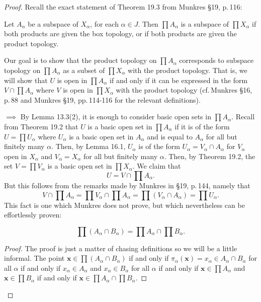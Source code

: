 \begin{proof}
Recall the exact statement of Theorem 19.3 from Munkres \S19,
p.\,116:
\begin{theorem*}
Let $A_\alpha$ be a subspace of $X_\alpha$, for each $\alpha\in
J$. Then $\prod A_\alpha$ is a subspace of $\prod X_\alpha$ if
both products are given the box topology, or if both products are
given the product topology.
\end{theorem*}
Our goal is to show that the  product topology on $\prod
A_\alpha$ corresponds to subspace topology on $\prod
A_\alpha$ as a subset of $\prod X_\alpha$ with the
product topology. That is, we will show that $U$ is open in
$\prod A_\alpha$ if and only if it can be expressed in the form
$V\cap\prod A_\alpha$ where $V$ is open in $\prod X_\alpha$ with
the product topology (cf.\,Munkres \S16, p.\,88 and Munkres \S19,
pp.\,114-116 for the relevant definitions).

$\implies$ By Lemma 13.3(2), it is enough to consider basic open
sets in $\prod A_\alpha$. Recall from Theorem 19.2 that $U$ is a
basic open set in $\prod A_\alpha$ if it is of the form $U=\prod
U_\alpha$ where $U_\alpha$ is a basic open set in $A_\alpha$ and
is equal to $A_\alpha$ for all but finitely many $\alpha$. Then,
by Lemma 16.1, $U_\alpha$ is of the form $U_\alpha=V_\alpha\cap
A_\alpha$ for $V_\alpha$ open in $X_\alpha$ and
$V_\alpha=X_\alpha$ for all but finitely many $\alpha$. Then, by
Theorem 19.2, the set $V=\prod V_\alpha$ is a basic open set in
$\prod X_\alpha$. We claim that
\[
U=V\cap\prod A_\alpha.
\]
But this follows from the remarks made by Munkres in \S19,
p.\,144, namely that
\[
V\cap\prod A_\alpha=\prod V_\alpha\cap\prod
A_\alpha=\prod\left(V_\alpha\cap A_\alpha\right)=\prod U_\alpha.
\]
This fact is one which Munkres does not prove, but which
nevertheless can be effortlessly proven:
\begin{lemma}
\[\prod\left(A_\alpha\cap B_\alpha\right)=\prod
  A_\alpha\cap\prod B_\alpha.\]
\end{lemma}
\begin{proof}
\renewcommand\qedsymbol{$\clubsuit$}
The proof is just a matter of chasing definitions so we will be a
little informal. The point $\mathbf{x}\in\prod\left(A_\alpha\cap
  B_\alpha\right)$ if and only if
$\pi_\alpha(\mathbf{x})=x_\alpha\in A_\alpha\cap B_\alpha$ for
all $\alpha$ if and only if $x_\alpha\in A_\alpha$ and
$x_\alpha\in B_\alpha$ for all $\alpha$ if and only if
$\mathbf{x}\in\prod A_\alpha$ and $\mathbf{x}\in\prod B_\alpha$
if and only if $\mathbf{x}\in\prod A_\alpha\cap\prod B_\alpha$.
 \end{proof}


\end{proof}
